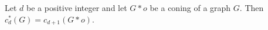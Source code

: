 \begin{theorem}\label{t:conecount}
	Let $d$ be a positive integer and let $G*o$ be a coning of a graph $G$.
	Then $c^*_{d}(G) = c_{d+1}(G*o)$.
\end{theorem}

